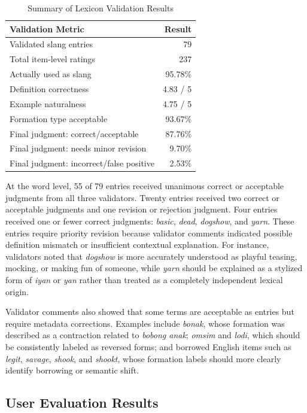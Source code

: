 \begin{table}[H]
\centering
\caption{Summary of Lexicon Validation Results}
\label{tab:lexicon_validation}
\begin{tabular}{p{}r}
\toprule
\textbf{Validation Metric} & \textbf{Result} \\
\midrule
Validated slang entries & 79 \\
Total item-level ratings & 237 \\
Actually used as slang & 95.78\% \\
Definition correctness & 4.83 / 5 \\
Example naturalness & 4.75 / 5 \\
Formation type acceptable & 93.67\% \\
Final judgment: correct/acceptable & 87.76\% \\
Final judgment: needs minor revision & 9.70\% \\
Final judgment: incorrect/false positive & 2.53\% \\
\bottomrule
\end{tabular}
\end{table}

At the word level, 55 of 79 entries received unanimous correct or acceptable judgments from all three validators. Twenty entries received two correct or acceptable judgments and one revision or rejection judgment. Four entries received one or fewer correct judgments: \textit{basic}, \textit{dead}, \textit{dogshow}, and \textit{yarn}. These entries require priority revision because validator comments indicated possible definition mismatch or insufficient contextual explanation. For instance, validators noted that \textit{dogshow} is more accurately understood as playful teasing, mocking, or making fun of someone, while \textit{yarn} should be explained as a stylized form of \textit{iyan} or \textit{yan} rather than treated as a completely independent lexical origin.

Validator comments also showed that some terms are acceptable as entries but require metadata corrections. Examples include \textit{bonak}, whose formation was described as a contraction related to \textit{bobong anak}; \textit{omsim} and \textit{lodi}, which should be consistently labeled as reversed forms; and borrowed English items such as \textit{legit}, \textit{savage}, \textit{shook}, and \textit{shookt}, whose formation labels should more clearly identify borrowing or semantic shift.

\subsection{User Evaluation Results}

